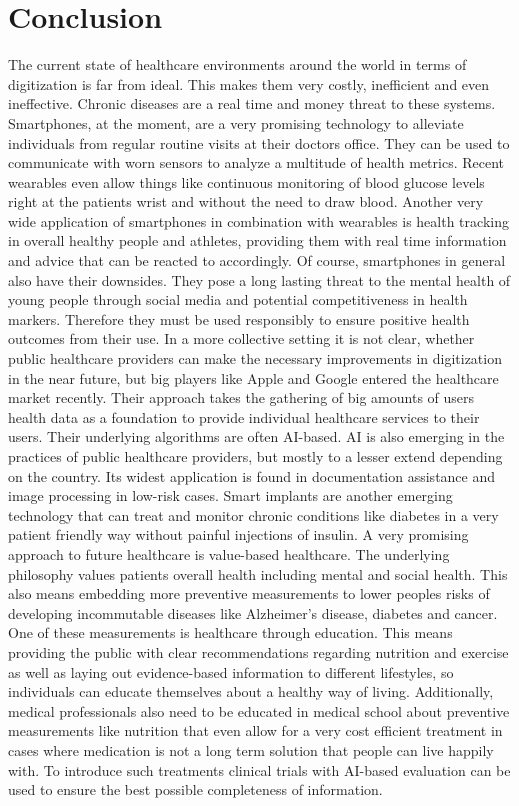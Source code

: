\section{Conclusion}%
\label{sec:conclusion}
The current state of healthcare environments around the world in terms of digitization is far from ideal. This makes them very costly, inefficient and even ineffective. Chronic diseases are a real time and money threat to these systems. Smartphones, at the moment, are a very promising technology to alleviate individuals from regular routine visits at their doctors office. They can be used to communicate with worn sensors to analyze a multitude of health metrics. Recent wearables even allow things like continuous monitoring of blood glucose levels right at the patients wrist and without the need to draw blood. Another very wide application of smartphones in combination with wearables is health tracking in overall healthy people and athletes, providing them with real time information and advice that can be reacted to accordingly. Of course, smartphones in general also have their downsides. They pose a long lasting threat to the mental health of young people through social media and potential competitiveness in health markers. Therefore they must be used responsibly to ensure positive health outcomes from their use. In a more collective setting it is not clear, whether public healthcare providers can make the necessary improvements in digitization in the near future, but big players like Apple and Google entered the healthcare market recently. Their approach takes the gathering of big amounts of users health data as a foundation to provide individual healthcare services to their users. Their underlying algorithms are often AI-based. AI is also emerging in the practices of public healthcare providers, but mostly to a lesser extend depending on the country. Its widest application is found in documentation assistance and image processing in low-risk cases. Smart implants are another emerging technology that can treat and monitor chronic conditions like diabetes in a very patient friendly way without painful injections of insulin. A very promising approach to future healthcare is value-based healthcare. The underlying philosophy values patients overall health including mental and social health. This also means embedding more preventive measurements to lower peoples risks of developing incommutable diseases like Alzheimer's disease, diabetes and cancer. One of these measurements is healthcare through education. This means providing the public with clear recommendations regarding nutrition and exercise as well as laying out evidence-based information to different lifestyles, so individuals can educate themselves about a healthy way of living. Additionally, medical professionals also need to be educated in medical school about preventive measurements like nutrition that even allow for a very cost efficient treatment in cases where medication is not a long term solution that people can live happily with. To introduce such treatments clinical trials with AI-based evaluation can be used to ensure the best possible completeness of information.
